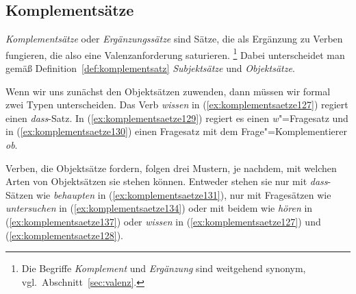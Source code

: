 \subsection{Komplementsätze}
\label{sec:komplementsaetze}

\textit{Komplementsätze} oder \textit{Ergänzungssätze} sind Sätze, die als Ergänzung zu Verben fungieren, die also eine Valenzanforderung saturieren.%
\footnote{Die Begriffe \textit{Komplement} und \textit{Ergänzung} sind weitgehend synonym, vgl.\ Abschnitt~\ref{sec:valenz}.}
Dabei unterscheidet man gemäß Definition~\ref{def:komplementsatz} \textit{Subjektsätze} und \textit{Objektsätze}.

\Np


Wenn wir uns zunächst den Objektsätzen zuwenden, dann müssen wir formal zwei Typen unterscheiden.
Das Verb \textit{wissen} in (\ref{ex:komplementsaetze127}) regiert einen \textit{dass}-Satz.
In (\ref{ex:komplementsaetze129}) regiert es einen \textit{w}"=Fragesatz und in (\ref{ex:komplementsaetze130}) einen Fragesatz mit dem Frage"=Komplementierer \textit{ob}.

\begin{exe}
  \ex\label{ex:komplementsaetze128}
  \begin{xlist}
  \end{xlist}
\end{exe}

Verben, die Objektsätze fordern, folgen drei Mustern, je nachdem, mit welchen Arten von Objektsätzen sie stehen können.
Entweder stehen sie nur mit \textit{dass}-Sätzen wie \textit{behaupten} in (\ref{ex:komplementsaetze131}), nur mit Fragesätzen wie \textit{untersuchen} in (\ref{ex:komplementsaetze134}) oder mit beidem wie \textit{hören} in (\ref{ex:komplementsaetze137}) oder \textit{wissen} in (\ref{ex:komplementsaetze127}) und (\ref{ex:komplementsaetze128}).

